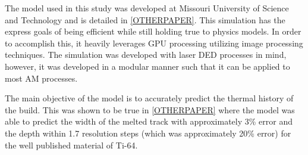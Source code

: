 \label{model_description}

The model used in this study was developed at Missouri University of Science and Technology and is detailed in \ref{OTHERPAPER}.
This simulation has the express goals of being efficient while still holding true to physics models.  In order to accomplish this, it heavily leverages GPU processing utilizing image processing techniques.  The simulation was developed with laser \ac{DED} processes in mind, however, it was developed in a modular manner such that it can be applied to most \ac{AM} processes.  

The main objective of the model is to accurately predict the thermal history of the build.  This was shown to be true in \ref{OTHERPAPER} where the model was able to predict the width of the melted track with approximately 3\% error and the depth within 1.7 resolution steps (which was approximately 20\% error) for the well published material of Ti-64.